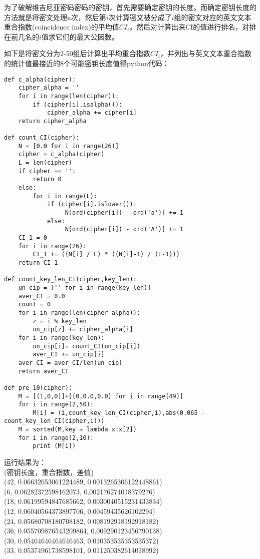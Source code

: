\documentclass{article}
\begin{document}
为了破解维吉尼亚密码密码的密钥，首先需要确定密钥的长度。而确定密钥长度的方法就是将密文处理n次，然后第$i$次计算密文被分成了$i$组的密文对应的英文文本重合指数(coincidence index)的平均值$CI_i$。然后对计算出来CI的值进行排名，对排在前几名的$i$值求它们的最大公因数。

如下是将密文分为2-50组后计算出平均重合指数$CI_i$，并列出与英文文本重合指数的统计值最接近的8个可能密钥长度值得python代码：\
\begin{lstlisting}[frame=shadowbox]
def c_alpha(cipher):
    cipher_alpha = ''
    for i in range(len(cipher)):
        if (cipher[i].isalpha()):
            cipher_alpha += cipher[i]
    return cipher_alpha

def count_CI(cipher):
    N = [0.0 for i in range(26)]
    cipher = c_alpha(cipher)
    L = len(cipher)
    if cipher == '':
        return 0
    else:
        for i in range(L):
            if (cipher[i].islower()):
                 N[ord(cipher[i]) - ord('a')] += 1
            else:
                 N[ord(cipher[i]) - ord('A')] += 1
    CI_1 = 0
    for i in range(26):
        CI_1 += ((N[i] / L) * ((N[i]-1) / (L-1)))
    return CI_1

def count_key_len_CI(cipher,key_len):        
    un_cip = ['' for i in range(key_len)]  
    aver_CI = 0.0
    count = 0
    for i in range(len(cipher_alpha)):
        z = i % key_len
        un_cip[z] += cipher_alpha[i]
    for i in range(key_len):
        un_cip[i]= count_CI(un_cip[i])
        aver_CI += un_cip[i]
    aver_CI = aver_CI/len(un_cip)
    return aver_CI

def pre_10(cipher):
    M = [(1,0,0)]+[(0,0.0,0.0) for i in range(49)]
    for i in range(2,50):
        M[i] = (i,count_key_len_CI(cipher,i),abs(0.065 - count_key_len_CI(cipher,i)))
    M = sorted(M,key = lambda x:x[2])
    for i in range(2,10):
        print (M[i])
\end{lstlisting}

运行结果为：\\
(密钥长度，重合指数，差值)\\
(42, 0.06632653061224489, 0.0013265306122448861)\\
(6, 0.06282372598162073, 0.002176274018379276)\\
(18, 0.06199594847685662, 0.0030040515231433834)\\
(12, 0.06040564373897706, 0.00459435626102294)\\
(24, 0.05680708180708182, 0.008192918192918182)\\
(36, 0.055709876543209864, 0.009290123456790138)\\
(30, 0.05464646464646463, 0.010353535353535372)\\
(33, 0.05374961738598101, 0.011250382614018992)
\end{document}
